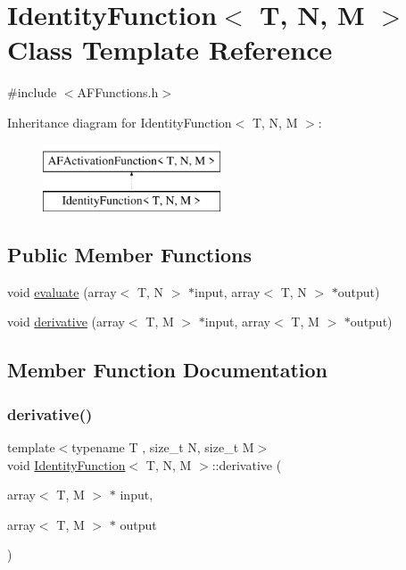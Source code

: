 \hypertarget{class_identity_function}{}\section{Identity\+Function$<$ T, N, M $>$ Class Template Reference}
\label{class_identity_function}


{\ttfamily \#include $<$A\+F\+Functions.\+h$>$}

Inheritance diagram for Identity\+Function$<$ T, N, M $>$\+:\begin{figure}[H]
\begin{center}
\leavevmode
\includegraphics[height=2.000000cm]{class_identity_function}
\end{center}
\end{figure}
\subsection*{Public Member Functions}
\begin{DoxyCompactItemize}
\item 
void \hyperlink{class_identity_function_af9dea511c5f9074f233aa0ffbc0fe18b}{evaluate} (array$<$ T, N $>$ $\ast$input, array$<$ T, N $>$ $\ast$output)
\item 
void \hyperlink{class_identity_function_a8096af623768acda994d6922711626be}{derivative} (array$<$ T, M $>$ $\ast$input, array$<$ T, M $>$ $\ast$output)
\end{DoxyCompactItemize}


\subsection{Member Function Documentation}
\mbox{\label{class_identity_function_a8096af623768acda994d6922711626be}} 
\subsubsection{\texorpdfstring{derivative()}{derivative()}}
{\footnotesize\ttfamily template$<$typename T , size\+\_\+t N, size\+\_\+t M$>$ \\
void \hyperlink{class_identity_function}{Identity\+Function}$<$ T, N, M $>$\+::derivative (\begin{DoxyParamCaption}\item[{array$<$ T, M $>$ $\ast$}]{input,  }\item[{array$<$ T, M $>$ $\ast$}]{output }\end{DoxyParamCaption})\hspace{0.3cm}{\ttfamily [inline]}}

